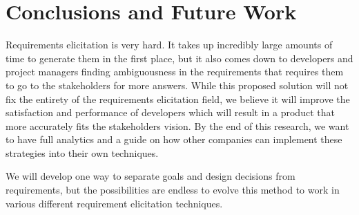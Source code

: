 \documentclass[format=acmlarge]{acmart}
\begin{document}
\section{Conclusions and Future Work}
Requirements elicitation is very hard. It takes up incredibly large amounts of time to generate them in the first place, but it also comes down to developers and project managers finding ambiguousness in the requirements that requires them to go to the stakeholders for more answers. While this proposed solution will not fix the entirety of the requirements elicitation field, we believe it will improve the satisfaction and performance of developers which will result in a product that more accurately fits the stakeholders vision. By the end of this research, we want to have full analytics and a guide on how other companies can implement these strategies into their own techniques.

We will develop one way to separate goals and design decisions from requirements, but the possibilities are endless to evolve this method to work in various different requirement elicitation techniques. 

\nocite{*}


\end{document}
